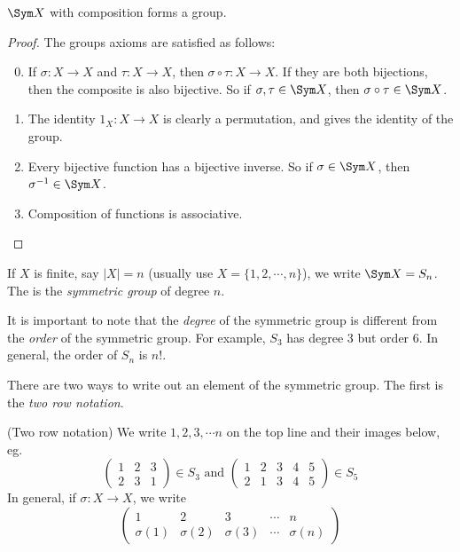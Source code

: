 \documentclass[a4paper]{article}
\begin{document}
\begin{thm}
  $\Sym X$ with composition forms a group.
\end{thm}

\begin{proof}
  The groups axioms are satisfied as follows:
  \begin{enumerate}[label=\arabic{*}.]
      \setcounter{enumi}{-1}
    \item If $\sigma: X\to X$ and $\tau: X\to X$, then $\sigma\circ\tau:X\to X$. If they are both bijections, then the composite is also bijective. So if $\sigma, \tau\in \Sym X$, then $\sigma\circ\tau\in\Sym X$.
    \item The identity $1_X:X\to X$ is clearly a permutation, and gives the identity of the group.
    \item Every bijective function has a bijective inverse. So if $\sigma\in \Sym X$, then $\sigma^{-1} \in \Sym X$.
    \item Composition of functions is associative.
  \end{enumerate}
\end{proof}

\begin{defi}
  If $X$ is finite, say $|X| = n$ (usually use $X = \{1, 2, \cdots, n\}$), we write $\Sym X = S_n$. The is the \emph{symmetric group} of degree $n$.
\end{defi}
It is important to note that the \emph{degree} of the symmetric group is different from the \emph{order} of the symmetric group. For example, $S_3$ has degree 3 but order 6. In general, the order of $S_n$ is $n!$.

There are two ways to write out an element of the symmetric group. The first is the \emph{two row notation}.
\begin{notation}
  (Two row notation) We write $1, 2, 3, \cdots n$ on the top line and their images below, eg.
  \[
    \begin{pmatrix}
      1 & 2 & 3\\
      2 & 3 & 1
    \end{pmatrix}\in S_3 \text{ and }
    \begin{pmatrix}
      1 & 2 & 3 & 4 & 5\\
      2 & 1 & 3 & 4 & 5
    \end{pmatrix}\in S_5
  \]
  In general, if $\sigma: X\to X$, we write
  \[
    \begin{pmatrix}
      1 & 2 & 3 &\cdots& n\\
      \sigma(1) & \sigma(2)&\sigma(3) &\cdots& \sigma{(n)}
    \end{pmatrix}
  \]
\end{notation}
\end{document}
